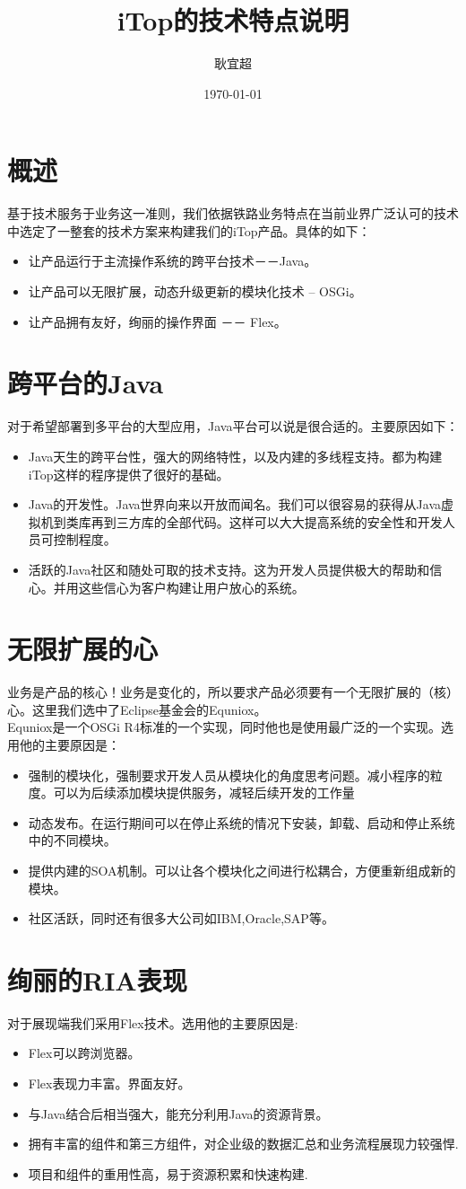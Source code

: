 \documentclass[a4paper,11pt,onecolumn,oneside]{article}
\title{iTop的技术特点说明}
\author{耿宜超}
\date{\today}
\begin{document}
\maketitle
\section{概述}
基于技术服务于业务这一准则，我们依据铁路业务特点在当前业界广泛认可的技术中选定了一整套的技术方案来构建我们的iTop产品。具体的如下：
\begin{itemize}
    \item 让产品运行于主流操作系统的跨平台技术－－Java。
    \item 让产品可以无限扩展，动态升级更新的模块化技术 -- OSGi。
    \item 让产品拥有友好，绚丽的操作界面 －－ Flex。
\end{itemize}
\section{跨平台的Java}
对于希望部署到多平台的大型应用，Java平台可以说是很合适的。主要原因如下：
\begin{itemize}
    \item Java天生的跨平台性，强大的网络特性，以及内建的多线程支持。都为构建iTop这样的程序提供了很好的基础。
    \item Java的开发性。Java世界向来以开放而闻名。我们可以很容易的获得从Java虚拟机到类库再到三方库的全部代码。这样可以大大提高系统的安全性和开发人员可控制程度。
    \item 活跃的Java社区和随处可取的技术支持。这为开发人员提供极大的帮助和信心。并用这些信心为客户构建让用户放心的系统。
\end{itemize}
\section{无限扩展的心}
业务是产品的核心！业务是变化的，所以要求产品必须要有一个无限扩展的（核）心。这里我们选中了Eclipse基金会的Equniox。\\
Equniox是一个OSGi R4标准的一个实现，同时他也是使用最广泛的一个实现。选用他的主要原因是：
\begin{itemize}
    \item 强制的模块化，强制要求开发人员从模块化的角度思考问题。减小程序的粒度。可以为后续添加模块提供服务，减轻后续开发的工作量
    \item 动态发布。在运行期间可以在停止系统的情况下安装，卸载、启动和停止系统中的不同模块。
    \item 提供内建的SOA机制。可以让各个模块化之间进行松耦合，方便重新组成新的模块。
    \item 社区活跃，同时还有很多大公司如IBM,Oracle,SAP等。
\end{itemize}
\section{绚丽的RIA表现}
对于展现端我们采用Flex技术。选用他的主要原因是:
\begin{itemize}
    \item Flex可以跨浏览器。
    \item Flex表现力丰富。界面友好。
    \item 与Java结合后相当强大，能充分利用Java的资源背景。
    \item 拥有丰富的组件和第三方组件，对企业级的数据汇总和业务流程展现力较强悍.
    \item 项目和组件的重用性高，易于资源积累和快速构建.
\end{itemize}
\end{document}
